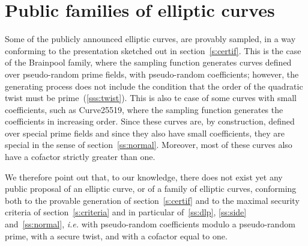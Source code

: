 \documentclass[twocolumn,letterpaper]{article}
\begin{document}
\section{Public families of elliptic curves}

Some of the publicly announced elliptic curves,
are provably sampled, in a way conforming to the presentation
sketched out in section~\ref{s:certif}.
This is the case of the Brainpool family,
where the sampling function generates
curves defined over pseudo-random prime fields,
with pseudo-random coefficients;
however, the generating process does not include
the condition that the order of the quadratic twist must be
prime~(\ref{sss:twist}).
This is also te case of some curves with small coefficients,
such as Curve25519,
where the sampling function generates the coefficients
in increasing order.
Since these curves are, by construction,
defined over special prime fields
and since they also have small coefficients,
they are special in the sense of section~\ref{ss:normal}.
Moreover, most of these curves
also have a cofactor strictly greater than one.

We therefore point out that, to our knowledge,
there does not exist yet any public proposal of an elliptic curve,
or of a family of elliptic curves, conforming both
to the provable generation of section~\ref{s:certif}
and to the maximal security criteria of section~\ref{s:criteria}
and in particular of~\ref{ss:dlp}, \ref{ss:side} and~\ref{ss:normal},
\emph{i.e.} with pseudo-random coefficients
modulo a pseudo-random prime,
with a secure twist,
and with a cofactor equal to one.



\end{document}
